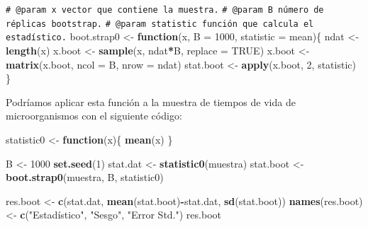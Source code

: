 \documentclass[
  spanish,
  10pt,
]{book}
\newenvironment{Shaded}{\begin{snugshade}}{\end{snugshade}}
\newcommand{\AttributeTok}[1]{\textcolor[rgb]{0.13,0.29,0.53}{#1}}
\newcommand{\CommentTok}[1]{\textcolor[rgb]{0.56,0.35,0.01}{\textit{#1}}}
\newcommand{\ConstantTok}[1]{\textcolor[rgb]{0.56,0.35,0.01}{#1}}
\newcommand{\ControlFlowTok}[1]{\textcolor[rgb]{0.13,0.29,0.53}{\textbf{#1}}}
\newcommand{\DecValTok}[1]{\textcolor[rgb]{0.00,0.00,0.81}{#1}}
\newcommand{\FunctionTok}[1]{\textcolor[rgb]{0.13,0.29,0.53}{\textbf{#1}}}
\newcommand{\NormalTok}[1]{#1}
\newcommand{\OtherTok}[1]{\textcolor[rgb]{0.56,0.35,0.01}{#1}}
\newcommand{\SpecialCharTok}[1]{\textcolor[rgb]{0.81,0.36,0.00}{\textbf{#1}}}
\newcommand{\StringTok}[1]{\textcolor[rgb]{0.31,0.60,0.02}{#1}}
\theoremstyle{break}
\theoremstyle{nonumberplain}
\renewcommand{\CommentTok}[1]{\textcolor[rgb]{0.41,0.41,0.41}{\texttt{#1}}}
\begin{document}
\begin{Shaded}
\begin{Highlighting}[]
\CommentTok{\#\textquotesingle{} @param x vector que contiene la muestra.}
\CommentTok{\#\textquotesingle{} @param B número de réplicas bootstrap.}
\CommentTok{\#\textquotesingle{} @param statistic función que calcula el estadístico.}
\NormalTok{boot.strap0 }\OtherTok{\textless{}{-}} \ControlFlowTok{function}\NormalTok{(x, }\AttributeTok{B =} \DecValTok{1000}\NormalTok{, }\AttributeTok{statistic =}\NormalTok{ mean)\{}
\NormalTok{  ndat }\OtherTok{\textless{}{-}} \FunctionTok{length}\NormalTok{(x)}
\NormalTok{  x.boot }\OtherTok{\textless{}{-}} \FunctionTok{sample}\NormalTok{(x, ndat}\SpecialCharTok{*}\NormalTok{B, }\AttributeTok{replace =} \ConstantTok{TRUE}\NormalTok{)}
\NormalTok{  x.boot }\OtherTok{\textless{}{-}} \FunctionTok{matrix}\NormalTok{(x.boot, }\AttributeTok{ncol =}\NormalTok{ B, }\AttributeTok{nrow =}\NormalTok{ ndat)}
\NormalTok{  stat.boot }\OtherTok{\textless{}{-}} \FunctionTok{apply}\NormalTok{(x.boot, }\DecValTok{2}\NormalTok{, statistic)}
\NormalTok{\}}
\end{Highlighting}
\end{Shaded}

Podríamos aplicar esta función a la muestra de tiempos de vida de microorganismos con el siguiente código:

\begin{Shaded}
\begin{Highlighting}[]
\NormalTok{statistic0 }\OtherTok{\textless{}{-}} \ControlFlowTok{function}\NormalTok{(x)\{}
  \FunctionTok{mean}\NormalTok{(x)}
\NormalTok{\}}

\NormalTok{B }\OtherTok{\textless{}{-}} \DecValTok{1000}
\FunctionTok{set.seed}\NormalTok{(}\DecValTok{1}\NormalTok{)}
\NormalTok{stat.dat }\OtherTok{\textless{}{-}} \FunctionTok{statistic0}\NormalTok{(muestra)}
\NormalTok{stat.boot }\OtherTok{\textless{}{-}} \FunctionTok{boot.strap0}\NormalTok{(muestra, B, statistic0)}

\NormalTok{res.boot }\OtherTok{\textless{}{-}} \FunctionTok{c}\NormalTok{(stat.dat, }\FunctionTok{mean}\NormalTok{(stat.boot)}\SpecialCharTok{{-}}\NormalTok{stat.dat, }\FunctionTok{sd}\NormalTok{(stat.boot))}
\FunctionTok{names}\NormalTok{(res.boot) }\OtherTok{\textless{}{-}} \FunctionTok{c}\NormalTok{(}\StringTok{"Estadístico"}\NormalTok{, }\StringTok{"Sesgo"}\NormalTok{, }\StringTok{"Error Std."}\NormalTok{)}
\NormalTok{res.boot}
\end{Highlighting}
\end{Shaded}
\end{document}
